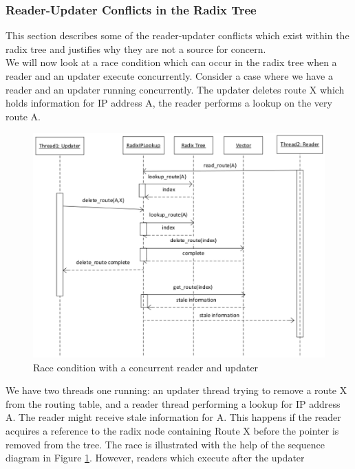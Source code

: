 \documentclass[a4paper]{article}
\begin{document}
\subsubsection{Reader-Updater Conflicts in the Radix Tree}
This section describes some of the reader-updater conflicts which
exist within the radix tree and justifies why they are not a source
for concern.\\

We will now look at a race condition which can occur in the radix tree
when a reader and an updater execute concurrently. Consider a case
where we have a reader and an updater running concurrently. The
updater deletes route X which holds information for IP address A, the reader performs a lookup on the very
route A.\\
\begin{figure}[tph]
\begin{center}
\includegraphics[scale=0.6]{../images/diagrams/race1eps.eps}
\end{center}
\caption{Race condition with a concurrent reader and updater}
\label{race1figure}
\end{figure}
We have two threads one running: an updater thread trying to remove a
route X from the routing table, and a reader thread performing a
lookup for IP address A. The reader might receive stale information
for A. This happens if the reader acquires a reference to the radix
node containing Route X before the pointer is removed from the
tree. The race is illustrated with the help of the sequence diagram in
Figure \ref{race1figure}. However, readers which execute after the updater
\end{document}
